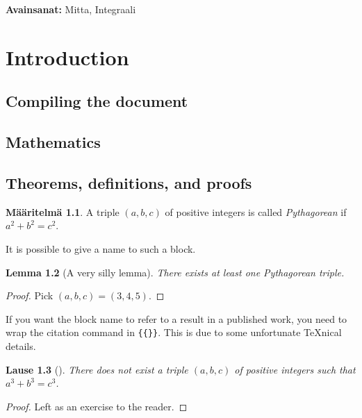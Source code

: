 \documentclass[a4paper, 11pt]{report}
\theoremstyle{plain}
\newtheorem{theorem}{Lause}[section] %
\newtheorem{lemma}[theorem]{Lemma} %
\theoremstyle{definition}
\newtheorem{definition}[theorem]{Määritelmä}
\theoremstyle{remark}
\begin{document}
\vfill

\noindent\textbf{Avainsanat:} Mitta, Integraali %




%
%
\cleardoublepage
\tableofcontents


%
%

\chapter{Introduction}

\section{Compiling the document}

\section{Mathematics}

\section{Theorems, definitions, and proofs}


\begin{definition}
A triple $(a, b, c)$ of positive integers is called \emph{Pythagorean} if $a^2 + b^2 = c^2$.
\end{definition}

It is possible to give a name to such a block.

\begin{lemma}[A very silly lemma]
There exists at least one Pythagorean triple.
\end{lemma}
\begin{proof}
Pick $(a, b, c) = (3, 4, 5)$.
\end{proof}

If you want the block name to refer to a result in a published work,
you need to wrap the citation command in \verb|{{}}|.
This is due to some unfortunate \TeX nical details.

\begin{theorem}[{{\cite[Theorem~0.5]{wiles}}}]
There does not exist a triple $(a, b, c)$ of positive integers such that $a^3 + b^3 = c^3$.
\end{theorem}
\begin{proof}
Left as an exercise to the reader.
\end{proof}
\end{document}
